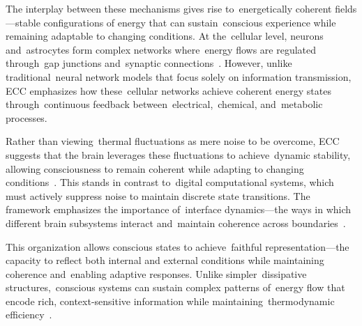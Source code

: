 The interplay between these mechanisms gives rise to~energetically coherent fields—stable configurations of energy that can sustain~conscious experience while remaining adaptable to changing conditions. At the~cellular level, neurons and~astrocytes form complex networks where~energy flows are regulated through~gap junctions and~synaptic connections~\cite{pellerin2004neuroenergetics}. However, unlike traditional~neural network models that focus solely on information transmission, ECC emphasizes how these~cellular networks achieve coherent energy states through~continuous feedback between~electrical,~chemical, and~metabolic processes.

Rather than viewing~thermal fluctuations as mere noise to be overcome, ECC suggests that the brain leverages these fluctuations to achieve~dynamic stability, allowing consciousness to remain coherent while adapting to changing conditions~\cite{faisal2008, mcdonnell2011}. This stands in contrast to~digital computational systems, which must actively suppress noise to maintain discrete state transitions. The framework emphasizes the importance of~interface dynamics—the ways in which different brain subsystems interact and~maintain coherence across boundaries~\cite{kelso2012}.

This organization allows conscious states to achieve~faithful representation—the capacity to reflect both internal and external conditions while maintaining coherence and~enabling adaptive responses. Unlike simpler~dissipative structures,~conscious systems can sustain complex patterns of~energy flow that encode rich, context-sensitive information while maintaining~thermodynamic efficiency~\cite{demetrius2015}.

